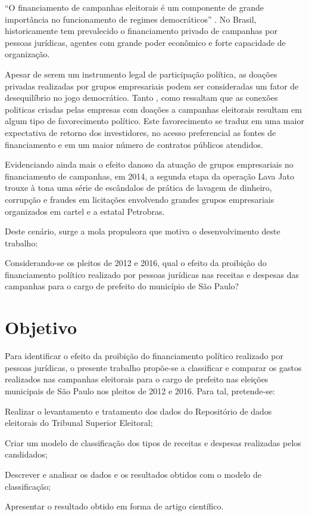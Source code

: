\documentclass[
	12pt,				%
	openright,			%
	oneside,			%
	a4paper,			%
	english,			%
	french,				%
	spanish,			%
	brazil,				%
	]{abntex2}
\begin{document}
“O financiamento de campanhas eleitorais é um
componente de grande importância no funcionamento de regimes democráticos” \cite{sztutman2013financiamento}. No Brasil, historicamente tem prevalecido o
financiamento privado de campanhas por pessoas jurídicas, agentes com grande
poder econômico e forte capacidade de organização.

Apesar de serem um instrumento legal de participação política, as doações
privadas realizadas por grupos empresariais podem ser consideradas um fator
de desequilíbrio no jogo democrático. Tanto ,
como  ressaltam que as conexões politicas criadas pelas empresas com doações a campanhas eleitorais resultam em algum tipo de favorecimento político. Este favorecimento se traduz em uma maior expectativa de retorno dos investidores, no acesso preferencial as fontes de financiamento e em um maior número de contratos públicos atendidos.

Evidenciando ainda mais o efeito danoso da atuação de grupos empresariais no financiamento de campanhas, em 2014, a segunda etapa da operação Lava Jato trouxe à tona uma série de escândalos de prática de lavagem de dinheiro, corrupção e fraudes em licitações envolvendo grandes grupos empresariais organizados em cartel e a estatal Petrobras.

Deste cenário, surge a mola propulsora que motiva o desenvolvimento deste trabalho:

Considerando-se os pleitos de 2012 e 2016, qual o efeito da proibição do financiamento político realizado por pessoas jurídicas nas receitas e despesas das campanhas para o cargo de prefeito do município de São Paulo?


\chapter[Objetivo]{Objetivo}

Para identificar o efeito da proibição do financiamento político realizado por pessoas jurídicas, o presente trabalho propõe-se a classificar e comparar os gastos  realizados nas campanhas eleitorais para o cargo de prefeito nas eleições municipais de São Paulo nos pleitos de 2012 e 2016. Para tal, pretende-se:

\begin{alineas}
 \item Realizar o levantamento e tratamento dos dados do Repositório de dados eleitorais do Tribunal Superior Eleitoral;
 \item Criar um modelo de classificação dos tipos de receitas e despesas realizadas pelos candidados;
 \item Descrever e analisar os dados e os resultados obtidos com o modelo de classificação;
 \item Apresentar o resultado obtido em forma de artigo científico.
\end{alineas}
\end{document}
